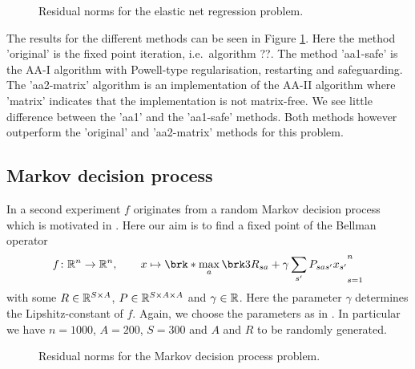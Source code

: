 \begin{figure}
	\centering
	{\scriptsize
	
	}
	\caption{Residual norms for the elastic net regression problem.}
	\label{pl:method_comparison_ISTA}
\end{figure}

The results for the different methods can be seen in Figure \ref{pl:method_comparison_ISTA}. Here the method 'original' is the fixed point iteration, i.e.\ algorithm ??. The method 'aa1-safe' is the AA-I algorithm with Powell-type regularisation, restarting and safeguarding. The 'aa2-matrix' algorithm is an implementation of the AA-II algorithm where 'matrix' indicates that the implementation is not matrix-free. We see little difference between the 'aa1' and the 'aa1-safe' methods. Both methods however outperform the 'original' and 'aa2-matrix' methods for this problem.

%	
%

\subsection{Markov decision process}

In a second experiment $f$ originates from a random Markov decision process which is motivated in \cite[Section 5.1f]{ZhaAA}. Here our aim is to find a fixed point of the Bellman operator
\begin{align*}
	f\colon\R^{n}\to\R^{n}, \qquad x\mapsto \brk*{\max_{a} \brk3{ R_{sa}+\gamma \sum_{s'}P_{sas'}x_{s'}}}_{s=1}^{n}
\end{align*}
with some $R\in\mathbb{R}^{S\times A}$, $P\in\mathbb{R}^{S\times A\times A}$ and $\gamma\in\mathbb{R}$. Here the parameter $\gamma$ determines the Lipshitz-constant of $f$. Again, we choose the parameters as in \cite[Section 5.2]{ZhaAA}. In particular we have $n=1000$, $A=200$, $S=300$ and $A$ and $R$ to be randomly generated.

\begin{figure}
	\centering
	{\scriptsize
	
	}
	\caption{Residual norms for the Markov decision process problem.}
	\label{pl:method_comparison_VI}
\end{figure}

